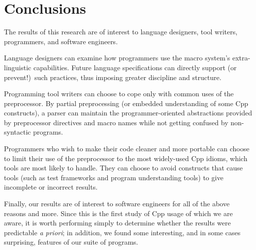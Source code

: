 \documentclass[10pt]{article}
\begin{document}
\section{Conclusions}
\label{sec:conclusion}




The results of this research are of interest to language designers, tool
writers, programmers, and software engineers.

Language designers can examine how programmers use the macro system's
extra-linguistic capabilities.  Future language specifications can
directly support (or prevent!)\ such practices, thus imposing greater
discipline and structure.


Programming tool writers can choose to cope only with common uses of the
preprocessor.  By partial preprocessing (or embedded understanding of
some Cpp constructs), a parser can maintain the
programmer-oriented abstractions provided by preprocessor directives and
macro names while not getting confused by non-syntactic programs.

Programmers who wish to make their code cleaner and more portable can
choose to limit their use of the preprocessor to the most widely-used Cpp
idioms, which tools are most likely to handle.  They can choose to avoid
constructs that cause tools (such as test frameworks and program
understanding tools) to give incomplete or incorrect results.


Finally, our results are of interest to software engineers for all of the
above reasons and more.  Since this is the first study of Cpp usage of
which we are aware, it is worth performing simply to determine whether the
results were predictable \emph{a priori}; in addition, we found
some interesting, and in some cases surprising, features of our suite of
programs.
\end{document}
